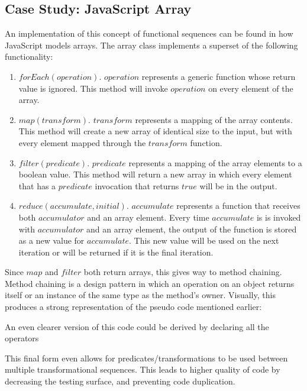 \subsection{Case Study: JavaScript Array}

An implementation of this concept of functional sequences can be found in how JavaScript models arrays.  The array class implements a superset of the following functionality:

\begin{enumerate}
  \item $forEach(operation)$.  $operation$ represents a generic function whose return value is ignored.  This method will invoke $operation$ on every element of the array.

  \item $map(transform)$.  $transform$ represents a mapping of the array contents.  This method will create a new array of identical size to the input, but with every element mapped through the $transform$ function.

  \item $filter(predicate)$.  $predicate$ represents a mapping of the array elements to a boolean value.  This method will return a new array in which every element that has a $predicate$ invocation that returns $true$ will be in the output.

  \item $reduce(accumulate, initial)$.  $accumulate$ represents a function that receives both $accumulator$ and an array element. Every time $accumulate$ is is invoked with $accumulator$ and an array element, the output of the function is stored as a new value for $accumulate$.  This new value will be used on the next iteration or will be returned if it is the final iteration.

\end{enumerate}

Since $map$ and $filter$ both return arrays, this gives way to method chaining. Method chaining is a design pattern in which an operation on an object returns itself or an instance of the same type as the method's owner. Visually, this produces a strong representation of the pseudo code mentioned earlier:

\begin{minipage}{\linewidth}

\end{minipage} 

An even clearer version of this code could be derived by declaring all the operators

\begin{minipage}{\linewidth}

\end{minipage}

This final form even allows for predicates/transformations to be used between multiple transformational sequences.  This leads to higher quality of code by decreasing the testing surface, and preventing code duplication. 